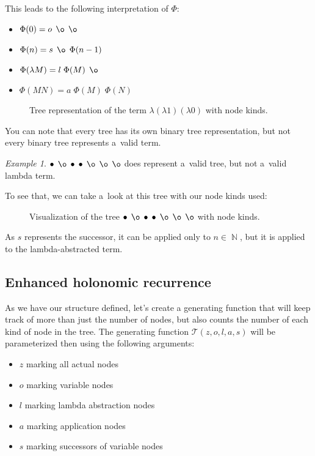 \documentclass[final]{article}
\theoremstyle{definition}
\theoremstyle{definition}
\theoremstyle{remark}
\newtheorem{example}{Example}[subsection]
\newcommand{\gf}[1]{\ensuremath{\mathcal{#1}}}
\DeclareMathOperator{\N}{\mathbb{N}}
\DeclareMathOperator{\n}{\bullet}
\DeclareMathOperator{\no}{\o}
\begin{document}
This leads to the following interpretation of \(\Phi\):

\begin{itemize}
    \item \(\Phi(0) = o\; \no\; \no\)
    \item \(\Phi(n) = s\; \no\; \Phi(n - 1)\)
    \item \(\Phi(\lambda M) = l\; \Phi(M)\; \no\)
    \item \(\Phi(M N) = a\; \Phi(M)\; \Phi(N)\)
\end{itemize}

\begin{figure}[H]
    \centering
    
    \caption{Tree representation of the term \(\lambda (\lambda 1) (\lambda 0)\) with node kinds.}%
    \label{fig:lambda_tree_example_3}
\end{figure}

You can note that every tree has its own binary tree representation, but not every binary tree represents a~valid term.

\begin{example}
    \(\n\; \no\; \n\; \n\; \no\; \no\; \no\) does represent a~valid tree, but not a~valid lambda term.

To see that, we can take a~look at this tree with our node kinds used:

\begin{figure}[H]
    \centering
    
    \caption{Visualization of the tree \(\n\; \no\; \n\; \n\; \no\; \no\; \no\) with node kinds.}%
    \label{fig:lambda_tree_invalid}
\end{figure}

As \(s\) represents the successor, it can be applied only to \(n \in \N\), but it is applied to the lambda-abstracted term.
\end{example}

\subsection{Enhanced holonomic recurrence}%
\label{sub:enhanced_holonomic_reccurence}

As we have our structure defined, let's create a generating function that will keep track of more than just the number of nodes, but also counts the number of each kind of node in the tree. The generating function \(\gf{T}(z, o, l, a, s)\) will be parameterized then using the following arguments:
\begin{itemize}
    \item \(z\) marking all actual nodes
    \item \(o\) marking variable nodes
    \item \(l\) marking lambda abstraction nodes
    \item \(a\) marking application nodes
    \item \(s\) marking successors of variable nodes
\end{itemize}
\end{document}

